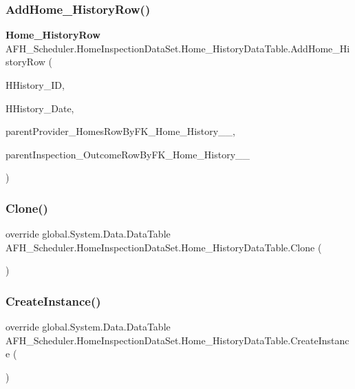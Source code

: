 \subsubsection{AddHome\_HistoryRow()\hspace{0.1cm}{\footnotesize\ttfamily [2/2]}}
{\footnotesize\ttfamily \textbf{ Home\+\_\+\+History\+Row} A\+F\+H\+\_\+\+Scheduler.\+Home\+Inspection\+Data\+Set.\+Home\+\_\+\+History\+Data\+Table.\+Add\+Home\+\_\+\+History\+Row (\begin{DoxyParamCaption}\item[{long}]{H\+History\+\_\+\+ID,  }\item[{string}]{H\+History\+\_\+\+Date,  }\item[{\textbf{ Provider\+\_\+\+Homes\+Row}}]{parent\+Provider\+\_\+\+Homes\+Row\+By\+F\+K\+\_\+\+Home\+\_\+\+History\+\_\+\_,  }\item[{\textbf{ Inspection\+\_\+\+Outcome\+Row}}]{parent\+Inspection\+\_\+\+Outcome\+Row\+By\+F\+K\+\_\+\+Home\+\_\+\+History\+\_\+\_ }\end{DoxyParamCaption})}

\mbox{\label{class_a_f_h___scheduler_1_1_home_inspection_data_set_1_1_home___history_data_table_aed98eaf8f57386c7a99e11a41217641c}} 
\subsubsection{Clone()}
{\footnotesize\ttfamily override global.\+System.\+Data.\+Data\+Table A\+F\+H\+\_\+\+Scheduler.\+Home\+Inspection\+Data\+Set.\+Home\+\_\+\+History\+Data\+Table.\+Clone (\begin{DoxyParamCaption}{ }\end{DoxyParamCaption})}

\mbox{\label{class_a_f_h___scheduler_1_1_home_inspection_data_set_1_1_home___history_data_table_a4afa253fb72049b463af3d7fa844525b}} 
\subsubsection{CreateInstance()}
{\footnotesize\ttfamily override global.\+System.\+Data.\+Data\+Table A\+F\+H\+\_\+\+Scheduler.\+Home\+Inspection\+Data\+Set.\+Home\+\_\+\+History\+Data\+Table.\+Create\+Instance (\begin{DoxyParamCaption}{ }\end{DoxyParamCaption})\hspace{0.3cm}{\ttfamily [protected]}}

